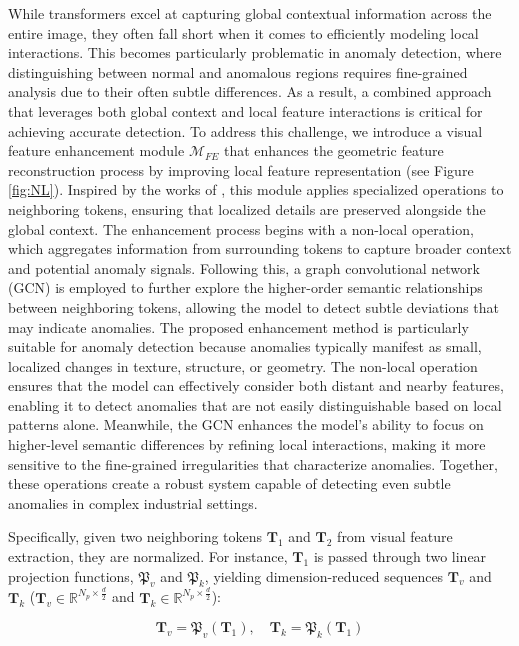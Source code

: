 While transformers excel at capturing global contextual information across the entire image, they often fall short when it comes to efficiently modeling local interactions. This becomes particularly problematic in anomaly detection, where distinguishing between normal and anomalous regions requires fine-grained analysis due to their often subtle differences. As a result, a combined approach that leverages both global context and local feature interactions is critical for achieving accurate detection. To address this challenge, we introduce a visual feature enhancement module $\mathcal{M}_{FE}$ that enhances the geometric feature reconstruction process by improving local feature representation (see Figure \ref{fig:NL}). Inspired by the works of \cite{te2020edge, wang2018non}, this module applies specialized operations to neighboring tokens, ensuring that localized details are preserved alongside the global context. The enhancement process begins with a non-local operation, which aggregates information from surrounding tokens to capture broader context and potential anomaly signals. Following this, a graph convolutional network (GCN) is employed to further explore the higher-order semantic relationships between neighboring tokens, allowing the model to detect subtle deviations that may indicate anomalies. The proposed enhancement method is particularly suitable for anomaly detection because anomalies typically manifest as small, localized changes in texture, structure, or geometry. The non-local operation ensures that the model can effectively consider both distant and nearby features, enabling it to detect anomalies that are not easily distinguishable based on local patterns alone. Meanwhile, the GCN enhances the model's ability to focus on higher-level semantic differences by refining local interactions, making it more sensitive to the fine-grained irregularities that characterize anomalies. Together, these operations create a robust system capable of detecting even subtle anomalies in complex industrial settings.

Specifically, given two neighboring tokens $\mathbf{T}_1$ and $\mathbf{T}_2$ from visual feature extraction, they are normalized. For instance, $\mathbf{T}_1$ is passed through two linear projection functions, $\mathfrak{P}_v$ and $\mathfrak{P}_k$, yielding dimension-reduced sequences $\mathbf{T}_v$ and $\mathbf{T}_k$ ($\mathbf{T}_v \in \mathbb{R}^{N_p \times \frac{d}{2}}$ and $\mathbf{T}_k \in \mathbb{R}^{N_p \times \frac{d}{2}}$):

\[
\mathbf{T}_v = \mathfrak{P}_v(\mathbf{T}_1), \quad \mathbf{T}_k = \mathfrak{P}_k(\mathbf{T}_1)
\]

